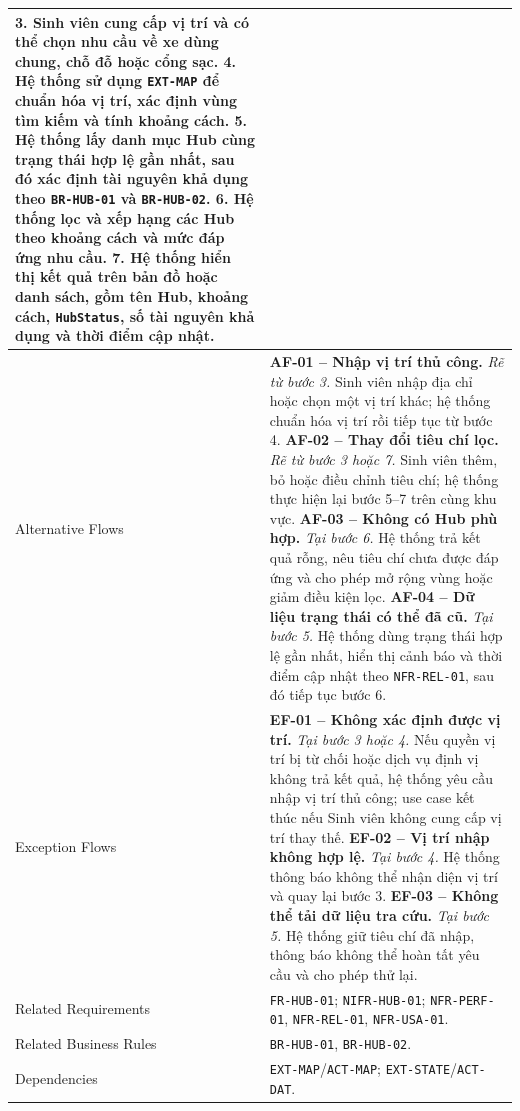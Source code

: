 \begin{longtable}{|L{42mm}|L{102mm}|}
    \textbf{3.} Sinh viên cung cấp vị trí và có thể chọn nhu cầu về xe dùng chung, chỗ đỗ hoặc cổng sạc.\newline
    \textbf{4.} Hệ thống sử dụng \texttt{EXT-MAP} để chuẩn hóa vị trí, xác định vùng tìm kiếm và tính khoảng cách.\newline
    \textbf{5.} Hệ thống lấy danh mục Hub cùng trạng thái hợp lệ gần nhất, sau đó xác định tài nguyên khả dụng theo \texttt{BR-HUB-01} và \texttt{BR-HUB-02}.\newline
    \textbf{6.} Hệ thống lọc và xếp hạng các Hub theo khoảng cách và mức đáp ứng nhu cầu.\newline
    \textbf{7.} Hệ thống hiển thị kết quả trên bản đồ hoặc danh sách, gồm tên Hub, khoảng cách, \texttt{HubStatus}, số tài nguyên khả dụng và thời điểm cập nhật.\\\hline
  Alternative Flows &
    \textbf{AF-01 -- Nhập vị trí thủ công.} \textit{Rẽ từ bước 3.} Sinh viên nhập địa chỉ hoặc chọn một vị trí khác; hệ thống chuẩn hóa vị trí rồi tiếp tục từ bước 4.\newline
    \textbf{AF-02 -- Thay đổi tiêu chí lọc.} \textit{Rẽ từ bước 3 hoặc 7.} Sinh viên thêm, bỏ hoặc điều chỉnh tiêu chí; hệ thống thực hiện lại bước 5--7 trên cùng khu vực.\newline
    \textbf{AF-03 -- Không có Hub phù hợp.} \textit{Tại bước 6.} Hệ thống trả kết quả rỗng, nêu tiêu chí chưa được đáp ứng và cho phép mở rộng vùng hoặc giảm điều kiện lọc.\newline
    \textbf{AF-04 -- Dữ liệu trạng thái có thể đã cũ.} \textit{Tại bước 5.} Hệ thống dùng trạng thái hợp lệ gần nhất, hiển thị cảnh báo và thời điểm cập nhật theo \texttt{NFR-REL-01}, sau đó tiếp tục bước 6.\\\hline
  Exception Flows &
    \textbf{EF-01 -- Không xác định được vị trí.} \textit{Tại bước 3 hoặc 4.} Nếu quyền vị trí bị từ chối hoặc dịch vụ định vị không trả kết quả, hệ thống yêu cầu nhập vị trí thủ công; use case kết thúc nếu Sinh viên không cung cấp vị trí thay thế.\newline
    \textbf{EF-02 -- Vị trí nhập không hợp lệ.} \textit{Tại bước 4.} Hệ thống thông báo không thể nhận diện vị trí và quay lại bước 3.\newline
    \textbf{EF-03 -- Không thể tải dữ liệu tra cứu.} \textit{Tại bước 5.} Hệ thống giữ tiêu chí đã nhập, thông báo không thể hoàn tất yêu cầu và cho phép thử lại.\\\hline
  Related Requirements & \texttt{FR-HUB-01}; \texttt{NIFR-HUB-01}; \texttt{NFR-PERF-01}, \texttt{NFR-REL-01}, \texttt{NFR-USA-01}.\\\hline
  Related Business Rules & \texttt{BR-HUB-01}, \texttt{BR-HUB-02}.\\\hline
  Dependencies & \texttt{EXT-MAP}/\texttt{ACT-MAP}; \texttt{EXT-STATE}/\texttt{ACT-DAT}.\\\hline
\end{longtable}
\normalsize

